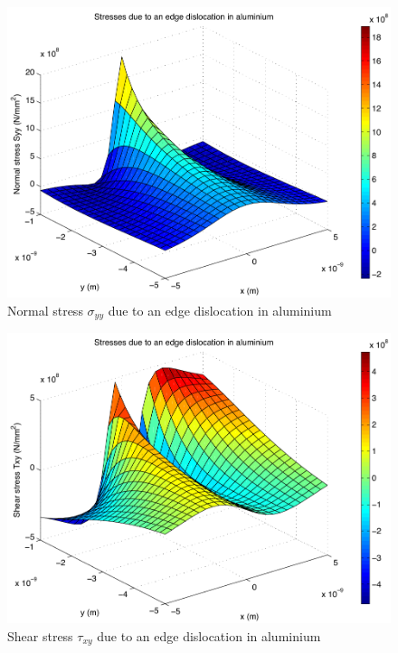 \begin{enumerate}
\begin{figure}[h]
	\includegraphics[width=\linewidth]{Graphics/Additional-Ex/3D-edge-disloc-plot-Syy}
	\caption{Normal stress $\sigma_{yy}$ due to an edge dislocation in aluminium}
	\label{fig:3D-edge-disloc-plot-Syy}
\end{figure}
\begin{figure}[h]
	\myfloatalign
	\includegraphics[width=\linewidth]{Graphics/Additional-Ex/3D-edge-disloc-plot-Txy}
	\caption{Shear stress $\tau_{xy}$ due to an edge dislocation in aluminium}
	\label{fig:3D-edge-disloc-plot-Txy}
\end{figure}


\end{enumerate}
